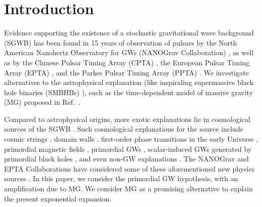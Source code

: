 \documentclass[prd,twocolumn,aps,psfig,nofootinbib,nobibnotes,superscriptaddress,preprintnumbers,times]{revtex4-2}
\begin{document}
\maketitle
\section{Introduction}
Evidence supporting the existence of a stochastic gravitational wave background (SGWB) has been found in 15 years of observation of pulsars by the North American Nanohertz Observatory for GWs (NANOGrav Collaboration) \cite{Agazie:2023}, as well as by the Chinese Pulsar Timing Array (CPTA) \cite{Xu:2023wog}, the European Pulsar Timing Array (EPTA) \cite{EPTA:2023sfo,EPTA:2023akd,EPTA:2023fyk}, and the Parkes Pulsar Timing Array (PPTA) \cite{Zic:2023gta,Reardon:2023gzh}. We investigate alternatives to the astrophysical explanation (like inspiraling supermassive black hole binaries (SMBHBs) \cite{Rajagopal:1995,Jaffe:2002rt,Burke-Spolaor:2018bvk}), such as the time-dependent model of massive gravity (MG) proposed in Ref.\ \cite{Fujita:2018ehq}. 

Compared to astrophysical origins, more exotic explanations lie in cosmological sources of the SGWB  \cite{Maggiore:1999vm, Caprini:2018mtu, Chen:2021wdo, Wu:2021kmd, Chen:2021ncc, PPTA:2022eul, Wu:2023pbt, Wu:2023dnp, Madge:2023cak, Ellis:2023oxs, Bian:2023dnv, Figueroa:2023zhu}. Such cosmological explanations for the source include  cosmic strings \cite{Damour:2004kw,Siemens:2006yp, Chen:2022azo,Bian:2022tju, Antusch:2024nqg}, domain walls \cite{Ferreira:2022zzo, Zhang:2023nrs, Gouttenoire:2023ftk}, first-order phase transitions in the early Universe \cite{Kibble:1976sj, Vilenkin:1984ib,Caprini:2010xv, Kobakhidze:2017mru, Arunasalam:2017ajm, Xue:2021gyq, NANOGrav:2021flc, Moore:2021ibq, Addazi:2023jvg, Athron:2023xlk, Bringmann:2023opz, Ashoorioon:2022raz, Gouttenoire:2023bqy}, primordial magnetic fields \cite{Neronov:2020qrl,Brandenburg:2021tmp,RoperPol:2022iel,Kahniashvili:2021gym}, primordial GWs \cite{Grishchuk:1976, Grishchuk:1977zz, Starobinsky:1980te, Linde:1981mu, Fabbri:1983us, Grishchuk:2005qe, Lasky:2015lej, Kawai:2023nqs, Basilakos:2023xof, Basilakos:2023jvp, Benetti:2021uea, Vagnozzi:2020gtf}, scalar-induced GWs \cite{Tomita:1967non, Saito:2008jc, Young:2014ana, Yuan:2019udt, Yuan:2019wwo, Chen:2019xse, Cai:2019bmk, Yuan:2019fwv, Liu:2021jnw, Liu:2023ymk, Cai:2023dls, Choudhury:2023fjs, Choudhury:2023fwk, Bhattacharya:2023ysp, Choudhury:2023hfm, Kawai:2021edk, Pi:2021dft, Domenech:2020ers, Wang:2023sij} generated by primordial black holes \cite{Zeldovich:1967lct,Hawking:1971ei,Carr:1974nx,Chen:2018czv,Chen:2018rzo,Liu:2018ess,Liu:2019rnx,Chen:2019irf,Liu:2020cds,Wu:2020drm,Chen:2021nxo,Chen:2022fda,Chen:2022qvg,Liu:2022iuf,Zheng:2022wqo, Choudhury:2013woa, Franciolini:2023pbf, Wang:2023ost}, and even non-GW explanations \cite{Chowdhury:2023xvy}. The NANOGrav and EPTA Collaborations have considered some of these aforementioned new physics sources \cite{Afzal:2023,EPTA:2023xxk}. In this paper, we consider the primordial GW hypothesis, with an amplification due to MG. We consider MG as a promising alternative to explain the present exponential expansion.
\end{document}

